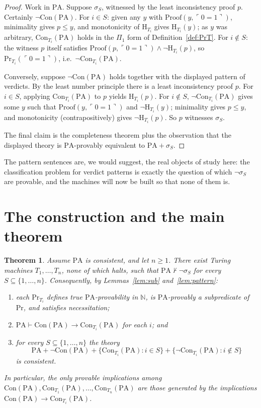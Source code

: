 \documentclass[11pt]{amsart}
\newtheorem{theorem}{Theorem}[section]
\theoremstyle{definition}
\theoremstyle{remark}
\newcommand{\PA}{\mathrm{PA}}
\newcommand{\Con}{\mathrm{Con}}
\newcommand{\Pf}{\mathrm{Proof}}
\newcommand{\Prov}{\mathrm{Pr}}
\newcommand{\HT}[1]{\mathrm{H}_{#1}}
\newcommand{\godel}[1]{\ulcorner #1 \urcorner}
\newcommand{\N}{\mathbb{N}}
\begin{document}
\begin{proof}
Work in $\PA$. Suppose $\sigma_S$, witnessed by the least inconsistency
proof $p$. Certainly $\neg\Con(\PA)$. For $i\in S$: given any $y$ with
$\Pf(y,\godel{0{=}1})$, minimality gives $p\le y$, and monotonicity of
$\HT{T_i}$ gives $\HT{T_i}(y)$; as $y$ was arbitrary, $\Con_{T_i}(\PA)$
holds in the $\Pi_1$ form of Definition~\ref{def:PrT}. For $i\notin S$:
the witness $p$ itself satisfies
$\Pf(p,\godel{0{=}1})\wedge\neg\HT{T_i}(p)$, so
$\Prov_{T_i}(\godel{0{=}1})$, i.e.\ $\neg\Con_{T_i}(\PA)$.

Conversely, suppose $\neg\Con(\PA)$ holds together with the displayed
pattern of verdicts. By the least number principle there is a
least inconsistency proof $p$. For $i\in S$, applying $\Con_{T_i}(\PA)$
to $p$ yields $\HT{T_i}(p)$. For $i\notin S$, $\neg\Con_{T_i}(\PA)$ gives
some $y$ such that $\Pf(y,\godel{0{=}1})$ and $\neg\HT{T_i}(y)$;
minimality gives $p\le y$, and monotonicity (contrapositively) gives
$\neg\HT{T_i}(p)$. So $p$ witnesses $\sigma_S$.

The final claim is the completeness theorem plus the observation that the
displayed theory is $\PA$-provably equivalent to $\PA+\sigma_S$.
\end{proof}

The pattern sentences are, we would suggest, the real objects of study
here: the classification problem for verdict patterns is exactly the
question of which $\neg\sigma_S$ are provable, and the machines will now
be built so that none of them is.

\section{The construction and the main theorem}\label{sec:main}

\begin{theorem}\label{thm:main}
Assume $\PA$ is consistent, and let $n\ge1$. There exist Turing machines
$T_1,\dots,T_n$, none of which halts, such that
$\PA\nvdash\neg\sigma_S$ for every $S\subseteq\{1,\dots,n\}$.
Consequently, by Lemmas~\ref{lem:sub} and~\ref{lem:pattern}:
\begin{enumerate}
\item each $\Prov_{T_i}$ defines true $\PA$-provability in $\N$, is
$\PA$-provably a subpredicate of $\Prov$, and satisfies necessitation;
\item $\PA\vdash\Con(\PA)\to\Con_{T_i}(\PA)$ for each $i$; and
\item for every $S\subseteq\{1,\dots,n\}$ the theory
\[
\PA+\neg\Con(\PA)+\{\Con_{T_i}(\PA):i\in S\}
   +\{\neg\Con_{T_i}(\PA):i\notin S\}
\]
is consistent.
\end{enumerate}
In particular, the only provable implications among
$\Con(\PA),\Con_{T_1}(\PA),\dots,\Con_{T_n}(\PA)$ are those generated by
the implications $\Con(\PA)\to\Con_{T_i}(\PA)$.
\end{theorem}
\end{document}
